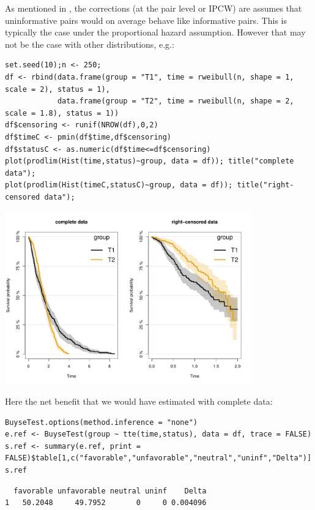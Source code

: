 \documentclass[12pt]{article}
\begin{document}
As mentioned in \cite{peron2021correcting}, the corrections (at the pair
level or IPCW) are assumes that uninformative pairs would on average
behave like informative pairs. This is typically the case under the
proportional hazard assumption. However that may not be the case with
other distributions, e.g.:
\lstset{language=r,label= ,caption= ,captionpos=b,numbers=none}
\begin{lstlisting}
set.seed(10);n <- 250; 
df <- rbind(data.frame(group = "T1", time = rweibull(n, shape = 1, scale = 2), status = 1),
            data.frame(group = "T2", time = rweibull(n, shape = 2, scale = 1.8), status = 1))
df$censoring <- runif(NROW(df),0,2)
df$timeC <- pmin(df$time,df$censoring)
df$statusC <- as.numeric(df$time<=df$censoring)
plot(prodlim(Hist(time,status)~group, data = df)); title("complete data");
plot(prodlim(Hist(timeC,statusC)~group, data = df)); title("right-censored data");
\end{lstlisting}
\begin{center}
\includegraphics[width=0.8\textwidth]{./figures/plot-crossingSurv.pdf}
\end{center}

Here the net benefit that we would have estimated with complete data:
\lstset{language=r,label= ,caption= ,captionpos=b,numbers=none}
\begin{lstlisting}
BuyseTest.options(method.inference = "none")
e.ref <- BuyseTest(group ~ tte(time,status), data = df, trace = FALSE)
s.ref <- summary(e.ref, print = FALSE)$table[1,c("favorable","unfavorable","neutral","uninf","Delta")]
s.ref
\end{lstlisting}

\begin{verbatim}
  favorable unfavorable neutral uninf    Delta
1   50.2048     49.7952       0     0 0.004096
\end{verbatim}
\end{document}
